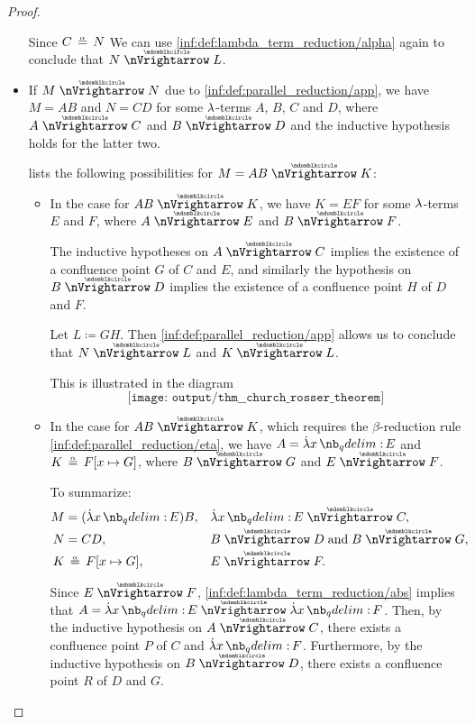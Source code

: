 \begin{proof}
\begin{itemize}
    Since \( C \aequiv N \) We can use \ref{inf:def:lambda_term_reduction/alpha} again to conclude that \( N \ppred L \).

    \item If \( M \ppred N \) due to \ref{inf:def:parallel_reduction/app}, we have \( M = AB \) and \( N = CD \) for some \( {\mathrm \lambda} \)-terms \( A \), \( B \), \( C \) and \( D \), where \( A \ppred C \) and \( B \ppred D \) and the inductive hypothesis holds for the latter two.

     lists the following possibilities for \( M = AB \ppred K \):
    \begin{itemize}
      \item In the case  for \( AB \ppred K \), we have \( K = EF \) for some \( {\mathrm \lambda} \)-terms \( E \) and \( F \), where \( A \ppred E \) and \( B \ppred F \).

      The inductive hypotheses on \( A \ppred C \) implies the existence of a confluence point \( G \) of \( C \) and \( E \), and similarly the hypothesis on \( B \ppred D \) implies the existence of a confluence point \( H \) of \( D \) and \( F \).

      Let \( L \coloneqq GH \). Then \ref{inf:def:parallel_reduction/app} allows us to conclude that \( N \ppred L \) and \( K \ppred L \).

      This is illustrated in the diagram
      \begin{equation*}
        \texttt{[image: output/thm\_\_church\_rosser\_theorem]}
      \end{equation*}

      \item In the case  for \( AB \ppred K \), which requires the \( \beta \)-reduction rule \ref{inf:def:parallel_reduction/eta}, we have \( A = \qabs x E \) and \( K \aequiv F[x \mapsto G] \), where \( B \ppred G \) and \( E \ppred F \).

      To summarize:
      \begin{align*}
        M &= (\qabs x E) B,           &&\qabs x E \ppred C,            \\
        N &= C D,                     &&B \ppred D \T{and} B \ppred G, \\
        K &\aequiv F[x \mapsto G],    &&E \ppred F.
      \end{align*}

      Since \( E \ppred F \), \ref{inf:def:lambda_term_reduction/abs} implies that \( A = \qabs x E \ppred \qabs x F \). Then, by the inductive hypothesis on \( A \ppred C \), there exists a confluence point \( P \) of \( C \) and \( \qabs x F \). Furthermore, by the inductive hypothesis on \( B \ppred D \), there exists a confluence point \( R \) of \( D \) and \( G \).


\end{itemize}
\end{itemize}
\end{proof}
